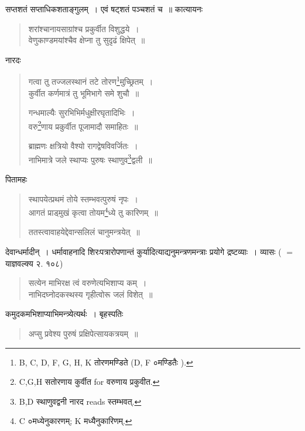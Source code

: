\documentclass[11pt, openany]{book}
\begin{document}
\newpage

\noindent
सप्तशतं सप्ताधिकशताङ्गुलम्~। एवं षट्शतं पञ्चशतं च~॥ कात्यायनः

\begin{quote}
{\vy शरांश्चानायसाग्रांश्च प्रकुर्वीत विशुद्धये~।\\
वेणुकाण्डमयांश्चैव क्षेप्ना तु सुदृढं क्षिपेत्~॥}
\end{quote}

नारदः 

\begin{quote}
{\vy गत्वा तु तज्जलस्थानं तटे तोरण\renewcommand{\thefootnote}{1}\footnote{B, C, D, F, G, H, K तोरणमण्डिते (D, F ०मण्डितैः ).}मुच्छ्रितम्~।\\
कुर्वीत कर्णमात्रं तु भूमिभागे समे शुचौ~॥

गन्धमाल्यैः सुरभिभिर्मधुक्षीरघृतादिभिः~।\\
वरु\renewcommand{\thefootnote}{2}\footnote{C,G,H सतोरणाय कुर्वीत for वरुणाय प्रकुवीत.}णाय प्रकुर्वीत पूजामादौ समाहितः~॥

ब्राह्मणः क्षत्रियो वैश्यो रागद्वेषविवर्जितः~।\\
नाभिमात्रे जले स्थाप्यः पुरुषः स्थाणुव\renewcommand{\thefootnote}{3}\footnote{B,D स्थाणुवद्वनी नारद reads स्तम्भवत्.}द्वली~॥}
\end{quote}

पितामहः 

\begin{quote}
{\vy स्थापयेत्प्रथमं तोये स्तम्भवत्पुरुषं नृपः~।\\
आगतं प्राड्मुखं कृत्वा तोयम\renewcommand{\thefootnote}{4}\footnote{C ०मध्येनुकारणम्; K मध्यैनुकारिणम्.}ध्ये तु कारिणम्~॥

ततस्त्वावाहयेद्देवान्सलिलं चानुमन्त्रयेत्~॥}
\end{quote}

देवान्धर्मादीन्~। धर्मावाहनादि शिरःपत्रारोपणान्तं कुर्यादित्याद्यनुमन्त्रणमन्त्राः प्रयोगे द्रष्टव्याः~। व्यासः ( $=$याज्ञवल्क्य २. १०८) 

\begin{quote}
{\vy सत्येन माभिरक्ष त्वं वरुणेत्यभिशाप्य कम्~।\\
नाभिदघ्नोदकस्थस्य गृहीत्वोरू जलं विशेत्~॥}
\end{quote}

कमुदकमभिशाप्याभिमन्त्र्येत्यर्थः~। बृहस्पतिः 

\begin{quote}
{\vy अप्सु प्रवेश्य पुरुषं प्रक्षिपेत्सायकत्रयम्~॥}
\end{quote}
\end{document}
